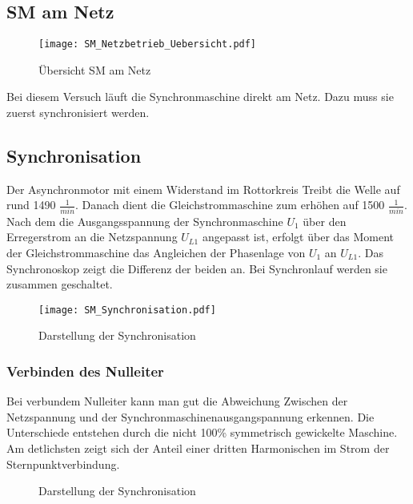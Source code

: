 \begin{flushleft}
\section{SM am Netz}

\vspace{0.3cm}
\begin{figure}[H]
    \centering
        \texttt{[image: SM\_Netzbetrieb\_Uebersicht.pdf]}
    \caption{Übersicht SM am Netz}
    \label{fig:abb1}
\end{figure}\vspace{0.3cm}
 Bei diesem Versuch läuft die Synchronmaschine direkt am Netz. Dazu muss sie zuerst synchronisiert werden. 

\subsection{Synchronisation}
Der Asynchronmotor mit einem Widerstand im Rottorkreis Treibt die Welle auf rund 1490 $\frac{1}{min}$. Danach dient die Gleichstrommaschine zum erhöhen auf 1500 $\frac{1}{min}$. Nach dem die Ausgangsspannung der Synchronmaschine $U_1$ über den Erregerstrom an die Netzspannung $U_{L1}$ angepasst ist, erfolgt über das Moment der Gleichstrommaschine das Angleichen der Phasenlage von $U_1$ an $U_{L1}$. Das Synchronoskop zeigt die Differenz der beiden an. Bei Synchronlauf werden sie zusammen geschaltet. 
\vspace{0.3cm}
\begin{figure}[H]
    \centering
        \texttt{[image: SM\_Synchronisation.pdf]}
    \caption{Darstellung der Synchronisation}
    \label{fig:abb1}
\end{figure}\vspace{0.3cm}
\subsubsection{Verbinden des Nulleiter}
Bei verbundem Nulleiter kann man gut die Abweichung Zwischen der Netzspannung und der Synchronmaschinenausgangspannung erkennen. Die Unterschiede entstehen durch die nicht 100\% symmetrisch gewickelte Maschine. Am detlichsten zeigt sich der Anteil einer dritten Harmonischen im Strom der Sternpunktverbindung.
\vspace{0.3cm}
\begin{figure}[H]
    \centering
    \caption{Darstellung der Synchronisation}
    \label{fig:abb1}
\end{figure}\vspace{0.3cm}

\end{flushleft}
